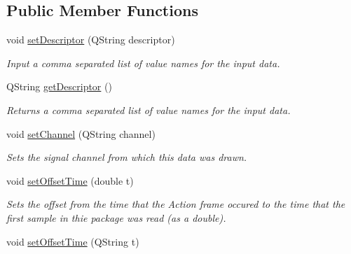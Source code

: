 \subsection*{Public Member Functions}
\begin{DoxyCompactItemize}
\item 
void \hyperlink{class_picto_1_1_behavioral_data_unit_package_af69a863c636394af24e2765c713b7a02}{set\-Descriptor} (Q\-String descriptor)
\begin{DoxyCompactList}\small\item\em Input a comma separated list of value names for the input data. \end{DoxyCompactList}\item 
Q\-String \hyperlink{class_picto_1_1_behavioral_data_unit_package_a832cf79f22ecaa3803893674033df07a}{get\-Descriptor} ()
\begin{DoxyCompactList}\small\item\em Returns a comma separated list of value names for the input data. \end{DoxyCompactList}\item 
\hypertarget{class_picto_1_1_behavioral_data_unit_package_a2a2727c3798ae85adf5701a721b88193}{void \hyperlink{class_picto_1_1_behavioral_data_unit_package_a2a2727c3798ae85adf5701a721b88193}{set\-Channel} (Q\-String channel)}\label{class_picto_1_1_behavioral_data_unit_package_a2a2727c3798ae85adf5701a721b88193}

\begin{DoxyCompactList}\small\item\em Sets the signal channel from which this data was drawn. \end{DoxyCompactList}\item 
\hypertarget{class_picto_1_1_behavioral_data_unit_package_a730d3ad161cd6191c62727d3feaedfd0}{void \hyperlink{class_picto_1_1_behavioral_data_unit_package_a730d3ad161cd6191c62727d3feaedfd0}{set\-Offset\-Time} (double t)}\label{class_picto_1_1_behavioral_data_unit_package_a730d3ad161cd6191c62727d3feaedfd0}

\begin{DoxyCompactList}\small\item\em Sets the offset from the time that the Action frame occured to the time that the first sample in thie package was read (as a double). \end{DoxyCompactList}\item 
\hypertarget{class_picto_1_1_behavioral_data_unit_package_a45dfac93bd0faed32072f1a0a0d3f8cf}{void \hyperlink{class_picto_1_1_behavioral_data_unit_package_a45dfac93bd0faed32072f1a0a0d3f8cf}{set\-Offset\-Time} (Q\-String t)}\label{class_picto_1_1_behavioral_data_unit_package_a45dfac93bd0faed32072f1a0a0d3f8cf}


\end{DoxyCompactItemize}
